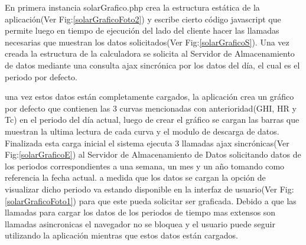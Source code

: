 En primera instancia solarGrafico.php crea la estructura estática de la aplicación(Ver Fig:\ref{solarGraficoFoto2}) y escribe cierto código javascript que permite luego en tiempo de ejecución del lado del cliente hacer las llamadas necesarias que muestran los datos solicitados(Ver Fig:\ref{solarGraficoS}). Una vez creada la estructura de la calculadora se solicita al Servidor de Almacenamiento de datos mediante una consulta ajax sincrónica por los datos del día, el cual es el periodo por defecto. {una vez estos datos están completamente cargados, la aplicación crea un gráfico por defecto que contienen las 3 curvas mencionadas con anterioridad(GHI, HR y Tc) en el periodo del día actual, luego de crear el gráfico se cargan las barras que muestran la ultima lectura de cada curva y el modulo de descarga de datos. Finalizada esta carga inicial el sistema ejecuta 3 llamadas ajax sincrónicas(Ver Fig:\ref{solarGraficoE}) al Servidor de Almacenamiento de Datos solicitando datos de los periodos correspondientes a una semana, un mes y un año tomando como referencia la fecha actual. a medida que los datos se cargan la opción de visualizar dicho periodo va estando disponible en la interfaz de usuario(Ver Fig:\ref{solarGraficoFoto1}) para que este pueda solicitar ser graficada. Debido a que las llamadas para cargar los datos de los periodos de tiempo mas extensos son llamadas asincronicas el navegador no se bloquea y el usuario puede seguir utilizando la aplicación mientras que estos datos están cargados.

}
